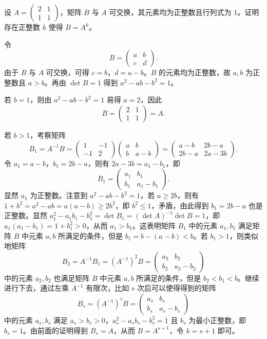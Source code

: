 设 $A=\begin{pmatrix}2&1\\1&1\end{pmatrix}$，矩阵 $B$ 与 $A$ 可交换，其元素均为正整数且行列式为 $1$。证明存在正整数 $k$ 使得 $B=A^{k}$。
\begin{solution}
令
\[
B=\begin{pmatrix}a&b\\c&d\end{pmatrix}.
\]
由于 $B$ 与 $A$ 可交换，可得 $c=b$，$d=a-b$。$B$ 的元素均为正整数，故 $a,b$ 为正整数且 $a>b$。再由 $\det B=1$ 得到 $a^2-ab-b^2=1$。

若 $b=1$，则由 $a^2-ab-b^2=1$ 易得 $a=2$，因此
\[
B=\begin{pmatrix}2&1\\1&1\end{pmatrix}=A.
\]

若 $b>1$，考察矩阵
\[
B_1=A^{-1}B=\begin{pmatrix}1&-1\\-1&2\end{pmatrix}\begin{pmatrix}a&b\\b&a-b\end{pmatrix}=\begin{pmatrix}a-b&2b-a\\2b-a&2a-3b\end{pmatrix}.
\]
令 $a_1=a-b$，$b_1=2b-a$，则有 $2a-3b=a_1-b_1$，即
\[
B_1=\begin{pmatrix}a_1&b_1\\b_1&a_1-b_1\end{pmatrix}.
\]
显然 $a_1$ 为正整数。注意到 $a^2-ab-b^2=1$，若 $a\geqslant 2b$，则有 $1+b^2=a^2-ab=a(a-b)\geqslant 2b^2$，即 $b^2\leqslant 1$，矛盾，由此得到 $b_1=2b-a$ 也是正整数。显然 $a_1^2-a_1b_1-b_1^2=\det B_1=(\det A)^{-1}\det B=1$，即 $a_1(a_1-b_1)=1+b_1^2>0$，从而 $a_1>b_1$。这表明矩阵 $B_1$ 中的元素 $a_1,b_1$ 满足矩阵 $B$ 中元素 $a,b$ 所满足的条件，但是 $b_1=b-(a-b)<b$。若 $b_1>1$，则类似地矩阵
\[
B_2=A^{-1}B_1=(A^{-1})^2B=\begin{pmatrix}a_2&b_2\\b_2&a_2-b_2\end{pmatrix}
\]
中的元素 $a_2,b_2$ 也满足矩阵 $B$ 中元素 $a,b$ 所满足的条件，但是 $b_2<b_1<b$。继续进行下去，通过左乘 $A^{-1}$ 有限次，比如 $s$ 次后可以使得得到的矩阵
\[
B_s=(A^{-1})^sB=\begin{pmatrix}a_s&b_s\\b_s&a_s-b_s\end{pmatrix}
\]
中的元素 $a_s,b_s$ 满足 $a_s>b_s>0$，$a_s^2-a_sb_s-b_s^2=1$ 且 $b_s$ 为最小正整数，即 $b_s=1$。由前面的证明得到 $B_s=A$，从而 $B=A^{s+1}$，令 $k=s+1$ 即可。
\end{solution}


